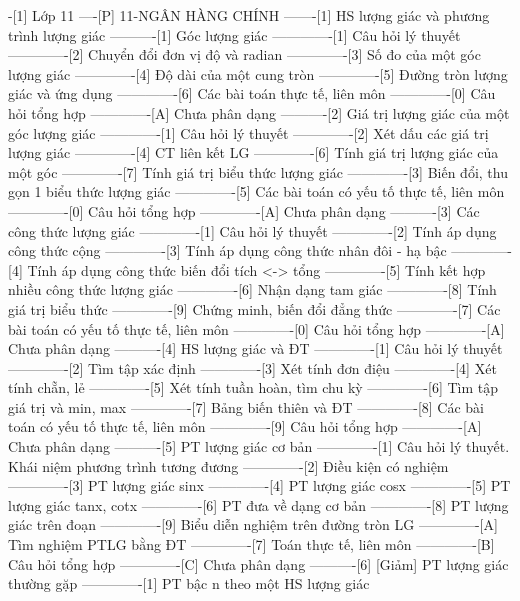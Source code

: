-[1] Lớp 11
----[P] 11-NGÂN HÀNG CHÍNH
-------[1] HS lượng giác và phương trình lượng giác
----------[1] Góc lượng giác
-------------[1] Câu hỏi lý thuyết
-------------[2] Chuyển đổi đơn vị độ và radian
-------------[3] Số đo của một góc lượng giác
-------------[4] Độ dài của một cung tròn
-------------[5] Đường tròn lượng giác và ứng dụng
-------------[6] Các bài toán thực tế, liên môn
-------------[0] Câu hỏi tổng hợp
-------------[A] Chưa phân dạng
----------[2] Giá trị lượng giác của một góc lượng giác
-------------[1] Câu hỏi lý thuyết
-------------[2] Xét dấu các giá trị lượng giác
-------------[4] CT liên kết LG
-------------[6] Tính giá trị lượng giác của một góc
-------------[7] Tính giá trị biểu thức lượng giác
-------------[3] Biến đổi, thu gọn 1 biểu thức lượng giác
-------------[5] Các bài toán có yếu tố thực tế, liên môn
-------------[0] Câu hỏi tổng hợp
-------------[A] Chưa phân dạng
----------[3] Các công thức lượng giác
-------------[1] Câu hỏi lý thuyết
-------------[2] Tính áp dụng công thức cộng
-------------[3] Tính áp dụng công thức nhân đôi - hạ bậc
-------------[4] Tính áp dụng công thức biến đổi tích <-> tổng
-------------[5] Tính kết hợp nhiều công thức lượng giác
-------------[6] Nhận dạng tam giác
-------------[8] Tính giá trị biểu thức
-------------[9] Chứng minh, biến đổi đẳng thức 
-------------[7] Các bài toán có yếu tố thực tế, liên môn
-------------[0] Câu hỏi tổng hợp
-------------[A] Chưa phân dạng
----------[4] HS lượng giác và ĐT
-------------[1] Câu hỏi lý thuyết
-------------[2] Tìm tập xác định
-------------[3] Xét tính đơn điệu
-------------[4] Xét tính chẵn, lẻ
-------------[5] Xét tính tuần hoàn, tìm chu kỳ
-------------[6] Tìm tập giá trị và min, max
-------------[7] Bảng biến thiên và ĐT
-------------[8] Các bài toán có yếu tố thực tế, liên môn
-------------[9] Câu hỏi tổng hợp
-------------[A] Chưa phân dạng
----------[5] PT lượng giác cơ bản
-------------[1] Câu hỏi lý thuyết. Khái niệm phương trình tương đương
-------------[2] Điều kiện có nghiệm
-------------[3] PT lượng giác sinx
-------------[4] PT lượng giác cosx
-------------[5] PT lượng giác tanx, cotx
-------------[6] PT đưa về dạng cơ bản
-------------[8] PT lượng giác trên đoạn
-------------[9] Biểu diễn nghiệm trên đường tròn LG
-------------[A] Tìm nghiệm PTLG bằng ĐT
-------------[7] Toán thực tế, liên môn
-------------[B] Câu hỏi tổng hợp
-------------[C] Chưa phân dạng
----------[6] [Giảm] PT lượng giác thường gặp
-------------[1] PT bậc n theo một HS lượng giác
